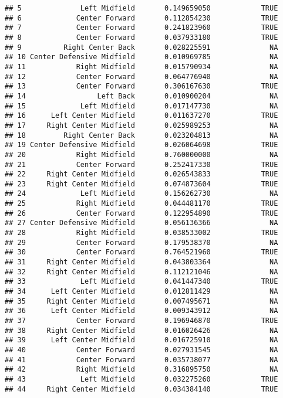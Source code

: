 \documentclass[]{article}
\begin{document}
\begin{verbatim}
## 5              Left Midfield       0.149659050            TRUE
## 6             Center Forward       0.112854230            TRUE
## 7             Center Forward       0.241823960            TRUE
## 8             Center Forward       0.037933180            TRUE
## 9          Right Center Back       0.028225591              NA
## 10 Center Defensive Midfield       0.010969785              NA
## 11            Right Midfield       0.015790934              NA
## 12            Center Forward       0.064776940              NA
## 13            Center Forward       0.306167630            TRUE
## 14                 Left Back       0.010900204              NA
## 15             Left Midfield       0.017147730              NA
## 16      Left Center Midfield       0.011637270            TRUE
## 17     Right Center Midfield       0.025989253              NA
## 18         Right Center Back       0.023204813              NA
## 19 Center Defensive Midfield       0.026064698            TRUE
## 20            Right Midfield       0.760000000              NA
## 21            Center Forward       0.252417330            TRUE
## 22     Right Center Midfield       0.026543833            TRUE
## 23     Right Center Midfield       0.074873604            TRUE
## 24             Left Midfield       0.156262730              NA
## 25            Right Midfield       0.044481170            TRUE
## 26            Center Forward       0.122954890            TRUE
## 27 Center Defensive Midfield       0.056136366              NA
## 28            Right Midfield       0.038533002            TRUE
## 29            Center Forward       0.179538370              NA
## 30            Center Forward       0.764521960            TRUE
## 31     Right Center Midfield       0.043803364              NA
## 32     Right Center Midfield       0.112121046              NA
## 33             Left Midfield       0.041447340            TRUE
## 34      Left Center Midfield       0.012811429              NA
## 35     Right Center Midfield       0.007495671              NA
## 36      Left Center Midfield       0.009343912              NA
## 37            Center Forward       0.196946870            TRUE
## 38     Right Center Midfield       0.016026426              NA
## 39      Left Center Midfield       0.016725910              NA
## 40            Center Forward       0.027931545              NA
## 41            Center Forward       0.035738077              NA
## 42            Right Midfield       0.316895750              NA
## 43             Left Midfield       0.032275260            TRUE
## 44     Right Center Midfield       0.034384140            TRUE

\end{verbatim}
\end{document}
